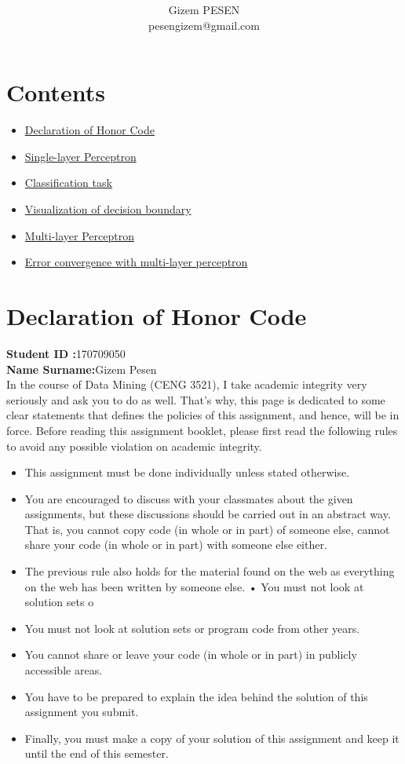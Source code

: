 \documentclass[onecolumn]{article}
\title{\spacecaps{CENG 3521 Data Mining Assigment 2 }\\ \normalsize \spacesc{} }
\author{Gizem PESEN\\pesengizem@gmail.com}
\begin{document}
\maketitle



\section{Contents }

\begin{itemize}
\item \hyperref[sec:1]{Declaration of Honor Code}
\item \hyperref[sec:2]{Single-layer Perceptron}
\item \hyperref[sec:2]{Classification task}
\item \hyperref[sec:2]{Visualization of decision boundary}
\item \hyperref[sec:2]{Multi-layer Perceptron}
\item \hyperref[sec:2]{Error convergence with multi-layer perceptron}
\end{itemize}

\section{Declaration of Honor Code}
\label{sec:1}
\textbf{Student ID :}170709050\\
\textbf{Name Surname:}Gizem Pesen\\

In the course of Data Mining (CENG 3521), I take academic integrity very seriously and ask
you to do as well. That’s why, this page is dedicated to some clear statements that defines
the policies of this assignment, and hence, will be in force. Before reading this assignment
booklet, please first read the following rules to avoid any possible violation on academic
integrity.

\begin{itemize}
\item This assignment must be done individually unless stated otherwise.
\item You are encouraged to discuss with your classmates about the given assignments, but
these discussions should be carried out in an abstract way. That is, you cannot copy
code (in whole or in part) of someone else, cannot share your code (in whole or in part)
with someone else either.
\item The previous rule also holds for the material found on the web as everything on the web
has been written by someone else.
• You must not look at solution sets o
\item You must not look at solution sets or program code from other years.
\item You cannot share or leave your code (in whole or in part) in publicly accessible areas.
\item You have to be prepared to explain the idea behind the solution of this assignment you
submit.
\item Finally, you must make a copy of your solution of this assignment and keep it until the
end of this semester.

\end{itemize}
\end{document}
